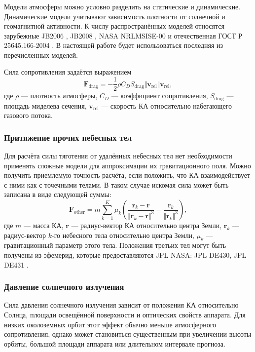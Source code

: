 Модели атмосферы можно условно разделить на статические и динамические. Динамические модели учитывают зависимость плотности от солнечной и геомагнитной активности. К числу распространённых моделей относятся зарубежные JB2006 \cite{bowman2008jb2006}, JB2008 \cite{bowman2008new}, NASA NRLMSISE-00 \cite{picone2002nrlmsise} и отечественная ГОСТ Р 25645.166-2004 \cite{gost25645_166_2004}. В настоящей работе будет использоваться последняя из перечисленных моделей.

Сила сопротивления задаётся выражением
\begin{equation}
    \mathbf{F}_{\text{drag}} = - \frac{1}{2} \rho C_D S_{\text{drag}} \Vert \mathbf{v}_{\text{rel}} \Vert \mathbf{v}_{\text{rel}}, 
    \label{drag_force}
\end{equation}
где $\rho$ --- плотность атмосферы, $C_D$ --- коэффициент сопротивления, $S_{\text{drag}}$ --- площадь миделева сечения, $\mathbf{v}_{\text{rel}}$ --- скорость КА относительно набегающего газового потока.

\subsubsection{Притяжение прочих небесных тел}
Для расчёта силы тяготения от удалённых небесных тел нет необходимости применять сложные модели для аппроксимации их гравитационного поля. Можно получить приемлемую точность расчёта, если положить, что КА взаимодействует с ними как с точечными телами. В таком случае искомая сила может быть записана в виде следующей суммы:
\begin{equation}
    \mathbf{F}_{\text{other}} = m \sum_{k=1}^{K} \mu_k \left( \frac{\mathbf r_k-\mathbf r}{\Vert \mathbf r_k-\mathbf r \Vert^3} - \frac{\mathbf r_k}{\Vert \mathbf r_k \Vert^3}
    \right),
\label{third_body_gravity}
\end{equation}
где $m$ --- масса КА, $\mathbf{r}$ --- радиус-вектор КА относительно центра Земли, $\mathbf{r}_k$ --- радиус-вектор $k$-го небесного тела относительно центра Земли, $\mu_k$ --- гравитационный параметр этого тела. Положения третьих тел могут быть получены из эфемерид, которые предоставляются JPL NASA: JPL DE430, JPL DE431 \cite{folkner2014planetary}.

\subsubsection{Давление солнечного излучения}

Сила давления солнечного излучения зависит от положения КА относительно Солнца, площади освещённой поверхности и оптических свойств аппарата. Для низких околоземных орбит этот эффект обычно меньше атмосферного сопротивления, однако может становиться существенным при увеличении высоты орбиты, большой площади аппарата или длительном интервале прогноза.

